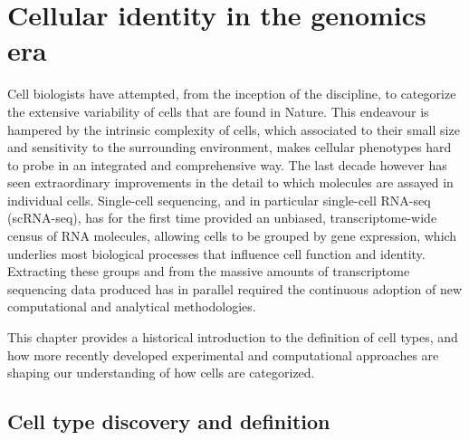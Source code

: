 
\chapter{Cellular identity in the genomics era}  %

\ifpdf
    \graphicspath{{Chapter1/Figs/Raster/}{Chapter1/Figs/PDF/}{Chapter1/Figs/}}
\else
    \graphicspath{{Chapter1/Figs/Vector/}{Chapter1/Figs/}}
\fi

Cell biologists have attempted, from the inception of the discipline, to categorize the extensive variability of cells that are found in Nature. This endeavour is hampered by the intrinsic complexity of cells, which associated to their small size and sensitivity to the surrounding environment, makes cellular phenotypes hard to probe in an integrated and comprehensive way. The last decade however has seen extraordinary improvements in the detail to which molecules are assayed in individual cells. Single-cell sequencing, and in particular single-cell RNA-seq (scRNA-seq), has for the first time provided an unbiased, transcriptome-wide census of RNA molecules, allowing cells to be grouped by gene expression, which underlies most biological processes that influence cell function and identity. Extracting these groups and from the massive amounts of transcriptome sequencing data produced has in parallel required the continuous adoption of new computational and analytical methodologies.

This chapter provides a historical introduction to the definition of cell types, and how more recently developed experimental and computational approaches are shaping our understanding of how cells are categorized.


\section{Cell type discovery and definition} %
\label{section1.3}

